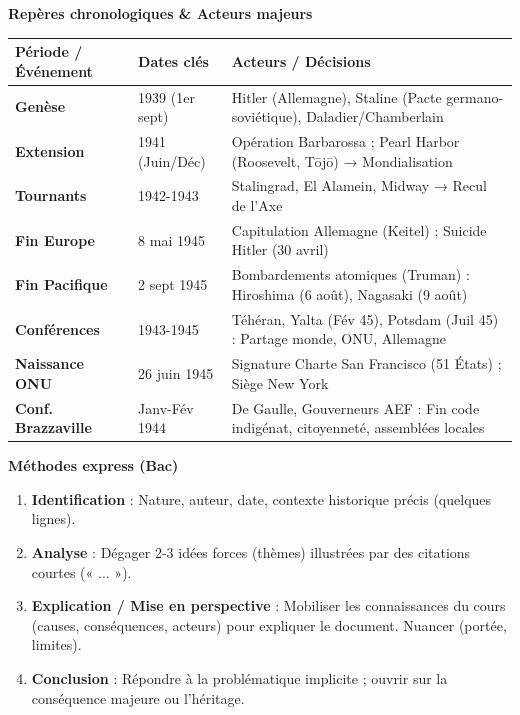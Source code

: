 \documentclass[11pt]{article}
\begin{document}
\begin{bilan}
\textbf{Repères chronologiques \& Acteurs majeurs}
\begin{center}
\begin{tabularx}{\linewidth}{|>{\bfseries}l|X|X|}\hline
\textbf{Période / Événement} & \textbf{Dates clés} & \textbf{Acteurs / Décisions} \\ \hline
Genèse & 1939 (1er sept) & Hitler (Allemagne), Staline (Pacte germano-soviétique), Daladier/Chamberlain \\ \hline
Extension & 1941 (Juin/Déc) & Opération Barbarossa ; Pearl Harbor (Roosevelt, Tōjō) → Mondialisation \\ \hline
Tournants & 1942-1943 & Stalingrad, El Alamein, Midway → Recul de l'Axe \\ \hline
Fin Europe & 8 mai 1945 & Capitulation Allemagne (Keitel) ; Suicide Hitler (30 avril) \\ \hline
Fin Pacifique & 2 sept 1945 & Bombardements atomiques (Truman) : Hiroshima (6 août), Nagasaki (9 août) \\ \hline
Conférences & 1943-1945 & Téhéran, Yalta (Fév 45), Potsdam (Juil 45) : Partage monde, ONU, Allemagne \\ \hline
Naissance ONU & 26 juin 1945 & Signature Charte San Francisco (51 États) ; Siège New York \\ \hline
Conf. Brazzaville & Janv-Fév 1944 & De Gaulle, Gouverneurs AEF : Fin code indigénat, citoyenneté, assemblées locales \\ \hline
\end{tabularx}
\end{center}

\textbf{Méthodes express (Bac)}
\begin{methode}
\begin{enumerate}
    \item \textbf{Identification} : Nature, auteur, date, contexte historique précis (quelques lignes).
    \item \textbf{Analyse} : Dégager 2-3 idées forces (thèmes) illustrées par des citations courtes (« ... »).
    \item \textbf{Explication / Mise en perspective} : Mobiliser les connaissances du cours (causes, conséquences, acteurs) pour expliquer le document. Nuancer (portée, limites).
    \item \textbf{Conclusion} : Répondre à la problématique implicite ; ouvrir sur la conséquence majeure ou l'héritage.
\end{enumerate}
\end{methode}


\end{bilan}
\end{document}
